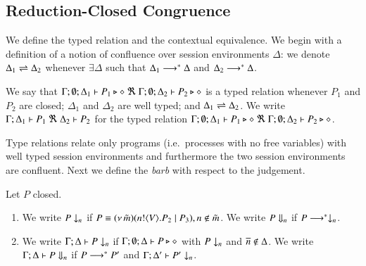 \subsection{Reduction-Closed Congruence}
\label{subsec:rc}
\noi We define the typed relation and the contextual equivalence.  
We begin with a definition of a notion of confluence
over session environments $\Delta$:
we denote $\Delta_1 \rightleftharpoons \Delta_2$ whenever $\exists \Delta$ such that
	$\Delta_1 \longrightarrow^\ast \Delta$ and $\Delta_2 \longrightarrow^\ast \Delta$.

\smallskip 

\begin{definition}\rm
	We say that
	$\Gamma; \emptyset; \Delta_1 \vdash P_1 \triangleright \diamond\ \Re \ \Gamma; \emptyset; \Delta_2 \vdash P_2 \triangleright \diamond$
	is a typed relation whenever $P_1$ and $P_2$ are closed;
		$\Delta_1$ and $\Delta_2$ are well typed; and 
		$\Delta_1 \rightleftharpoons \Delta_2$.
We write
$\horel{\Gamma}{\Delta_1}{P_1}{\ \Re \ }{\Delta_2}{P_2}$
for the typed relation $\Gamma; \emptyset; \Delta_1 \vdash P_1 \triangleright \diamond\ \Re \ \Gamma; \emptyset; \Delta_2 \vdash P_2 \triangleright \diamond$.
\end{definition}

\smallskip 

Type relations relate only programs (i.e.\ processes with no free variables) with
well typed session environments and furthermore the two session environments
are confluent.
Next we define the {\em barb} \cite{MiSa92} 
with respect to the judgement. 

\smallskip 

\begin{definition}[Barbs]\rm
Let $P$ closed.
\begin{enumerate}
		\item	We write $P \downarrow_{n}$ if $P \equiv (\nu\, \tilde{m})(n ! \langle V \rangle . P_2 \;|\; P_3), n \notin \tilde{m}$.
			We write $P \Downarrow_{n}$ if $P \longrightarrow^* \downarrow_{n}$.

		\item	We write $\Gamma; \Delta \vdash P \downarrow_{n}$ if
			$\Gamma; \emptyset; \Delta \vdash P \triangleright \diamond$ with $P \downarrow_{n}$ and $\overline{n} \notin \Delta$.
			We write $\Gamma; \Delta \vdash P \Downarrow_{n}$ if $P \longrightarrow^* P'$ and
			$\Gamma; \Delta' \vdash P' \downarrow_{n}$.			
	\end{enumerate}
\end{definition}

